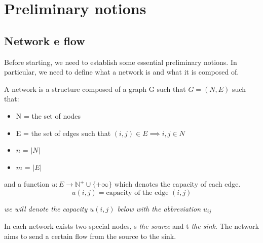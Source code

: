 
\chapter{Preliminary notions} \label{chap:preliminaries}

\section{Network e flow}
    Before starting, we need to establish some essential preliminary notions. In particular, we need to define what a network is and what it is composed of.
\begin{definition}[Network]
    A network is a structure composed of a graph G such that $G = (N,E)$ such that:\begin{itemize}
        \item N = the set of nodes
        \item E = the set of edges such that $(i,j) \in E \implies i,j\in N$
        \item $n$ = $|N|$
        \item $m$ = $|E|$
    \end{itemize}
    and a function $u: E \rightarrow \mathbb{N}^+\cup \{+\infty\}$ which denotes the capacity of each edge.
    \[u(i,j) = \text{capacity of the edge } (i,j)\]
    \begin{center}
        \textit{we will denote the capacity $u(i,j)$ below with the abbreviation $u_{ij}$}
    \end{center}
\end{definition}
In each network exists two special nodes, s \textit{the source} and t \textit{the sink}. The network aims to send a certain flow from the source to the sink.
